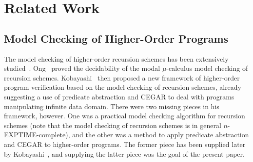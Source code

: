 \section{Related Work}
\label{sec:related}

\subsection{Model Checking of Higher-Order Programs}

The model checking of higher-order recursion schemes has been 
extensively 
studied~\cite{Knapik2002,Ong2006,Kobayashi2009a}. 
Ong~\cite{Ong2006} proved the decidability of the modal \(\mu\)-calculus 
model checking of recursion schemes. Kobayashi~\cite{Kobayashi2009} then 
proposed a new framework of higher-order program verification based on 
the model checking of recursion schemes, already suggesting a use of 
predicate abstraction and CEGAR to deal with programs manipulating 
infinite data domain. There were two missing pieces in his framework, 
however. One was a practical model checking algorithm for recursion 
schemes (note that the model checking of recursion schemes is in general 
\(n\)-EXPTIME-complete), and the other was a method to apply predicate 
abstraction and CEGAR to higher-order programs. The former piece has 
been supplied later by Kobayashi~\cite{Kobayashi2009c}, and supplying 
the latter piece was the goal of the present paper.

